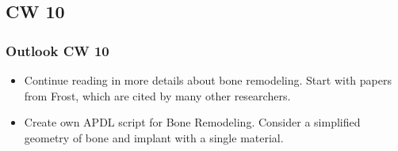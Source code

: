 \subsection{CW 10}
\begin{frame}
  \frametitle{Outlook CW 10}
	\begin{itemize}
		\item Continue reading in more details about bone remodeling. Start with papers from Frost, which are cited by many other researchers.
		\item Create own APDL script for Bone Remodeling. Consider a simplified geometry of bone and implant with a single material.
	\end{itemize}
\end{frame}

